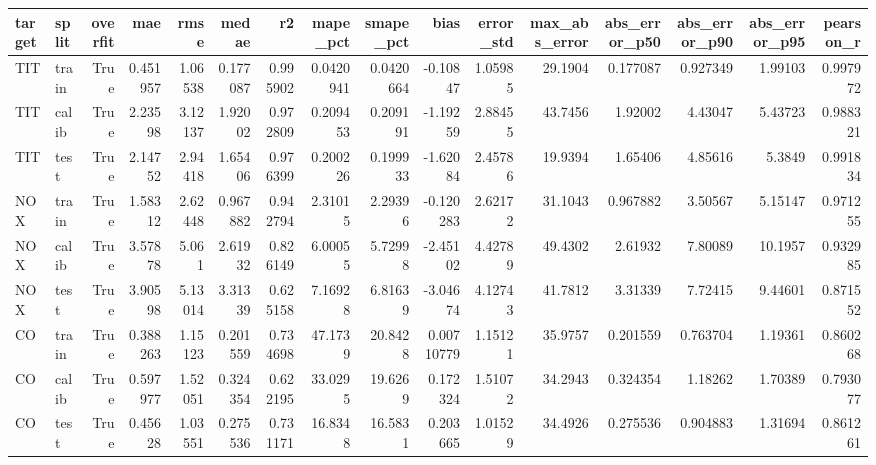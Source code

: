\begin{tabular}{llrrrrrrrrrrrrrr}
\toprule
target & split & overfit & mae & rmse & medae & r2 & mape\_pct & smape\_pct & bias & error\_std & max\_abs\_error & abs\_error\_p50 & abs\_error\_p90 & abs\_error\_p95 & pearson\_r \\
\midrule
TIT & train & True & 0.451957 & 1.06538 & 0.177087 & 0.995902 & 0.0420941 & 0.0420664 & -0.10847 & 1.05985 & 29.1904 & 0.177087 & 0.927349 & 1.99103 & 0.997972 \\
TIT & calib & True & 2.23598 & 3.12137 & 1.92002 & 0.972809 & 0.209453 & 0.209191 & -1.19259 & 2.88455 & 43.7456 & 1.92002 & 4.43047 & 5.43723 & 0.988321 \\
TIT & test & True & 2.14752 & 2.94418 & 1.65406 & 0.976399 & 0.200226 & 0.199933 & -1.62084 & 2.45786 & 19.9394 & 1.65406 & 4.85616 & 5.3849 & 0.991834 \\
NOX & train & True & 1.58312 & 2.62448 & 0.967882 & 0.942794 & 2.31015 & 2.29396 & -0.120283 & 2.62172 & 31.1043 & 0.967882 & 3.50567 & 5.15147 & 0.971255 \\
NOX & calib & True & 3.57878 & 5.061 & 2.61932 & 0.826149 & 6.00055 & 5.72998 & -2.45102 & 4.42789 & 49.4302 & 2.61932 & 7.80089 & 10.1957 & 0.932985 \\
NOX & test & True & 3.90598 & 5.13014 & 3.31339 & 0.625158 & 7.16928 & 6.81639 & -3.04674 & 4.12743 & 41.7812 & 3.31339 & 7.72415 & 9.44601 & 0.871552 \\
CO & train & True & 0.388263 & 1.15123 & 0.201559 & 0.734698 & 47.1739 & 20.8428 & 0.00710779 & 1.15121 & 35.9757 & 0.201559 & 0.763704 & 1.19361 & 0.860268 \\
CO & calib & True & 0.597977 & 1.52051 & 0.324354 & 0.622195 & 33.0295 & 19.6269 & 0.172324 & 1.51072 & 34.2943 & 0.324354 & 1.18262 & 1.70389 & 0.793077 \\
CO & test & True & 0.45628 & 1.03551 & 0.275536 & 0.731171 & 16.8348 & 16.5831 & 0.203665 & 1.01529 & 34.4926 & 0.275536 & 0.904883 & 1.31694 & 0.861261 \\
\bottomrule
\end{tabular}
